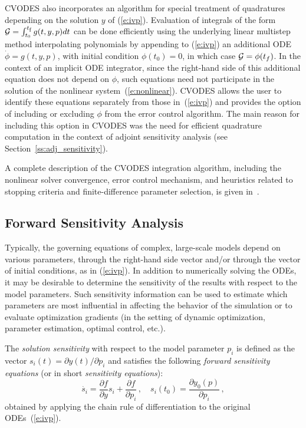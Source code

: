 CVODES also incorporates an algorithm for special treatment of
quadratures depending on the solution $y$ of (\ref{e:ivp}).
Evaluation of integrals of the form
${\cal G} = \int_{t_0}^{t_\mb{f}} g(t,y,p) dt$ can be done efficiently using the
underlying linear multistep method interpolating polynomials by
appending to (\ref{e:ivp}) an additional ODE
$\dot\phi = g(t,y,p)$, with initial condition $\phi(t_0) = 0$,
in which case ${\cal G} = \phi(t_f)$. In the context of an implicit ODE
integrator, since the right-hand side of this additional equation does not
depend on $\phi$, such equations need not participate in the solution of
the nonlinear system~(\ref{e:nonlinear}). CVODES allows the user to
identify these equations separately from those in~(\ref{e:ivp}) and
provides the option of including or excluding $\phi$ from the error
control algorithm.
%
The main reason for including this option in CVODES was the need for
efficient quadrature computation in the context of adjoint sensitivity 
analysis (see Section~\ref{ss:adj_sensitivity}).

A complete description of the CVODES integration algorithm, including 
the nonlinear solver convergence, error control mechanism, and heuristics 
related to stopping criteria and finite-difference parameter selection, is
given in~\cite{HBGLSSW:04}.


\subsection{Forward Sensitivity Analysis}\label{ss:fwd_sensitivity}

Typically, the governing equations of complex, large-scale models
depend on various parameters,  through the right-hand side vector 
and/or through the vector of initial conditions, as in (\ref{e:ivp}).
In addition to numerically solving the ODEs, it may be desirable to
determine the sensitivity of the results with respect to the model
parameters. 
Such sensitivity information can be used to estimate which
parameters are most influential in affecting the behavior of the
simulation or to evaluate optimization gradients (in the setting of dynamic
optimization, parameter estimation, optimal control, etc.).

The {\em solution sensitivity} with respect to the model parameter
$p_i$ is defined as the vector 
$s_i (t) = {\partial y(t)}/{\partial p_i}$
and satisfies the following {\em forward sensitivity equations}
(or in short {\em sensitivity equations}):
\begin{equation}\label{e:sens_eqns}
\dot{s_i}  = \frac{\partial f}{\partial y} s_i + \frac{\partial f}{\partial p_i} \, ,
\quad s_i(t_0)  = \frac{\partial y_{0}(p)}{\partial p_i} \, ,
\end{equation}
obtained by applying the chain rule of differentiation to the original
ODEs~(\ref{e:ivp}). 

